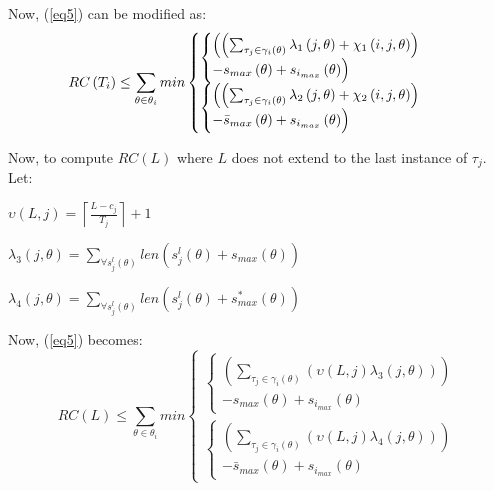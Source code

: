 \documentclass{sig-alternate}
\begin{document}
Now, (\ref{eq5}) can be modified as:
\begin{equation}
RC\left(T_{i}\right)\le \sum_{\theta\in\theta_{i}}min\begin{cases}
\begin{cases}
\Bigl(\left(\sum_{\tau_{j}\in\gamma_i\left(\theta\right)}\lambda_{1}\left(j,\theta\right)+\chi_{1}\left(i,j,\theta\right)\right)\\
-s_{max}\left(\theta\right)+s_{i_{max}}\left(\theta\right)\Bigr)\end{cases}\\
\begin{cases}
\Bigl(\left(\sum_{\tau_{j}\in\gamma_i\left(\theta\right)}\lambda_{2}\left(j,\theta\right)+\chi_{2}\left(i,j,\theta\right)\right)\\
-\bar{s}_{max}\left(\theta\right)+s_{i_{max}}\left(\theta\right)\Bigr)\end{cases}\end{cases}\label{eq15}\end{equation}



Now, to compute $RC(L)$ where $L$ does not extend to the last instance of $\tau_{j}$. Let:
\begin{compactitem}
\item $\upsilon\left(L,j\right)=\left\lceil\frac{L-c_{j}}{T_{j}}\right\rceil+1$
\item $\lambda_{3}\left(j,\theta\right)=\sum_{\forall s_{j}^{l}\left(\theta\right)}len\left(s_{j}^{l}\left(\theta\right)+s_{max}\left(\theta\right)\right)$
\item $\lambda_{4}\left(j,\theta\right)=\sum_{\forall s_{j}^{l}\left(\theta\right)}len\left(s_{j}^{l}\left(\theta\right)+s_{max}^{*}\left(\theta\right)\right)$
\end{compactitem}
Now, (\ref{eq5}) becomes: 
\begin{equation}
RC\left(L\right)\le \sum_{\theta\in\theta_{i}}min\begin{cases}
\begin{cases}
\left(\sum_{\tau_{j}\in\gamma_i\left(\theta\right)}\left(\upsilon\left(L,j\right)\lambda_{3}\left(j,\theta\right)\right)\right)\\
-s_{max}\left(\theta\right)+s_{i_{max}}\left(\theta\right)\end{cases}\\
\begin{cases}
\left(\sum_{\tau_{j}\in\gamma_i\left(\theta\right)}\left(\upsilon\left(L,j\right)\lambda_{4}\left(j,\theta\right)\right)\right)\\
-\bar{s}_{max}\left(\theta\right)+s_{i_{max}}\left(\theta\right)\end{cases}\end{cases}\label{eq16}\end{equation}
\end{document}
